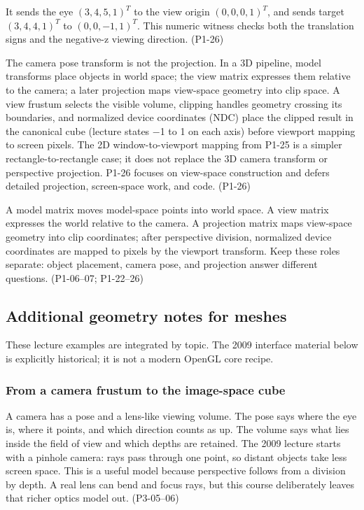 It sends the eye \((3,4,5,1)^T\) to the view origin \((0,0,0,1)^T\), and sends target \((3,4,4,1)^T\) to \((0,0,-1,1)^T\). This numeric witness checks both the translation signs and the negative-z viewing direction. (P1-26)

The camera pose transform is not the projection. In a 3D pipeline, model transforms place objects in world space; the view matrix expresses them relative to the camera; a later projection maps view-space geometry into clip space. A view frustum selects the visible volume, clipping handles geometry crossing its boundaries, and normalized device coordinates (NDC) place the clipped result in the canonical cube (lecture states −1 to 1 on each axis) before viewport mapping to screen pixels. The 2D window-to-viewport mapping from P1-25 is a simpler rectangle-to-rectangle case; it does not replace the 3D camera transform or perspective projection. P1-26 focuses on view-space construction and defers detailed projection, screen-space work, and code. (P1-26)

A model matrix moves model-space points into world space. A view matrix expresses the world relative to the camera. A projection matrix maps view-space geometry into clip coordinates; after perspective division, normalized device coordinates are mapped to pixels by the viewport transform. Keep these roles separate: object placement, camera pose, and projection answer different questions. (P1-06--07; P1-22--26)

\subsection{Additional geometry notes for meshes}\label{03-visual-computing-i-ch003-additional-geometry-notes-for-meshes}

These lecture examples are integrated by topic. The 2009 interface material below is explicitly historical; it is not a modern OpenGL core recipe.

\subsubsection{From a camera frustum to the image-space cube}\label{03-visual-computing-i-ch003-from-a-camera-frustum-to-the-image-space-cube}

A camera has a pose and a lens-like viewing volume. The pose says where the eye is, where it points, and which direction counts as up. The volume says what lies inside the field of view and which depths are retained. The 2009 lecture starts with a pinhole camera: rays pass through one point, so distant objects take less screen space. This is a useful model because perspective follows from a division by depth. A real lens can bend and focus rays, but this course deliberately leaves that richer optics model out. (P3-05--06)


